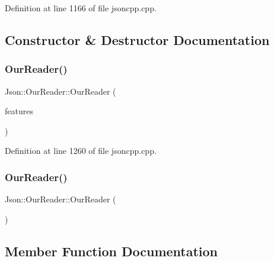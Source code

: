 Definition at line 1166 of file jsoncpp.\+cpp.



\subsection{Constructor \& Destructor Documentation}
\hypertarget{class_json_1_1_our_reader_a48a850914b9c8d7781be172930c478e5}{}\label{class_json_1_1_our_reader_a48a850914b9c8d7781be172930c478e5} 
\subsubsection{\texorpdfstring{Our\+Reader()}{OurReader()}\hspace{0.1cm}{\footnotesize\ttfamily [1/2]}}
{\footnotesize\ttfamily Json\+::\+Our\+Reader\+::\+Our\+Reader (\begin{DoxyParamCaption}\item[{\hyperlink{class_json_1_1_our_features}{Our\+Features} const \&}]{features }\end{DoxyParamCaption})}



Definition at line 1260 of file jsoncpp.\+cpp.

\hypertarget{class_json_1_1_our_reader_aee013005522c0d34d2e14962851487ac}{}\label{class_json_1_1_our_reader_aee013005522c0d34d2e14962851487ac} 
\subsubsection{\texorpdfstring{Our\+Reader()}{OurReader()}\hspace{0.1cm}{\footnotesize\ttfamily [2/2]}}
{\footnotesize\ttfamily Json\+::\+Our\+Reader\+::\+Our\+Reader (\begin{DoxyParamCaption}\item[{\hyperlink{class_json_1_1_our_reader}{Our\+Reader} const \&}]{ }\end{DoxyParamCaption})\hspace{0.3cm}{\ttfamily [private]}}



\subsection{Member Function Documentation}
\hypertarget{class_json_1_1_our_reader_ad7318c37469a9106069a236fb4b10e1f}{}\label{class_json_1_1_our_reader_ad7318c37469a9106069a236fb4b10e1f} 
